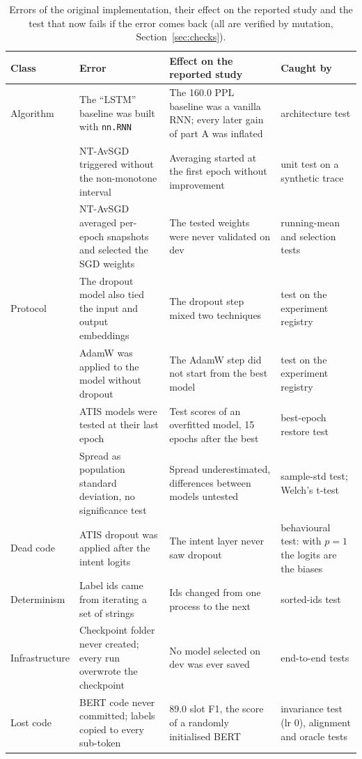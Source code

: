 \documentclass[10pt,twocolumn,a4paper]{article}
\begin{document}
\begin{table}[t]
  \caption{Errors of the original implementation, their effect on the reported study and the test that now fails
  if the error comes back (all are verified by mutation, Section~\ref{sec:checks}).}
  \label{tab:errors}
  \centering
  \small
  \setlength{\tabcolsep}{4pt}
  \begin{tabular}{l p{5.2cm} p{5.6cm} p{4.1cm}}
    \toprule
    Class & Error & Effect on the reported study & Caught by \\
    \midrule
    Algorithm & The ``LSTM'' baseline was built with \texttt{nn.RNN} & The 160.0 PPL baseline was a vanilla RNN;
      every later gain of part A was inflated & architecture test \\
    & NT-AvSGD triggered without the non-monotone interval & Averaging started at the first epoch without
      improvement & unit test on a synthetic trace \\
    & NT-AvSGD averaged per-epoch snapshots and selected the SGD weights & The tested weights were never
      validated on dev & running-mean and selection tests \\
    \midrule
    Protocol & The dropout model also tied the input and output embeddings & The dropout step mixed two techniques
      & test on the experiment registry \\
    & AdamW was applied to the model without dropout & The AdamW step did not start from the best model & test on
      the experiment registry \\
    & ATIS models were tested at their last epoch & Test scores of an overfitted model, 15 epochs after the best &
      best-epoch restore test \\
    & Spread as population standard deviation, no significance test & Spread underestimated, differences between
      models untested & sample-std test; Welch's t-test \\
    \midrule
    Dead code & ATIS dropout was applied after the intent logits & The intent layer never saw dropout & behavioural
      test: with $p=1$ the logits are the biases \\
    \midrule
    Determinism & Label ids came from iterating a set of strings & Ids changed from one process to the next &
      sorted-ids test \\
    \midrule
    Infrastructure & Checkpoint folder never created; every run overwrote the checkpoint & No model selected on dev
      was ever saved & end-to-end tests \\
    \midrule
    Lost code & BERT code never committed; labels copied to every sub-token & 89.0 slot F1, the score of a randomly
      initialised BERT & invariance test (lr 0), alignment and oracle tests \\
    \bottomrule
  \end{tabular}
\end{table}
\end{document}
